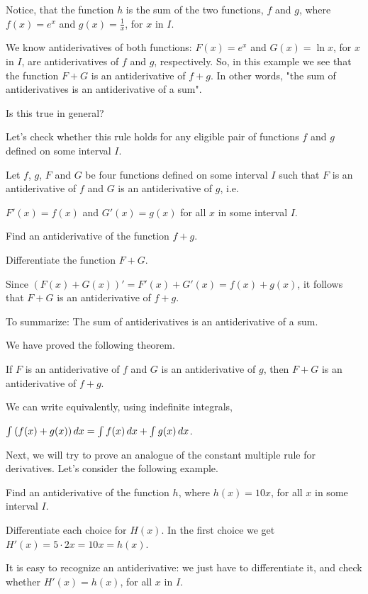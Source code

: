 \documentclass{ximera}
\begin{document}
Notice, that the function $h$ is the sum of the two functions, $f$ and $g$, where $f(x)=e^x$ and $g(x)=\frac{1}{x}$, for $x$ in $I$.

We know antiderivatives of both functions:  $F(x)=e^x$ and $G(x)=\ln{x}$,  for $x$ in $I$, are antiderivatives of $f$ and $g$, respectively.
So, in this example we see that the function  $F+G$ is an antiderivative of $f+g$.
In other words, "the sum of antiderivatives is an antiderivative of a sum".

Is this true in general?

Let's check whether this rule holds for any eligible pair of functions $f$ and $g$ defined on some interval $I$.
 \begin{question}
Let $f$, $g$, $F$ and $G$ be four functions defined on some interval $I$ such that $F$ is an antiderivative of $f$ and $G$ is an antiderivative of $g$, i.e.

$F'(x)=f(x)$ and $G'(x)=g(x)$ for all $x$ in some interval $I$.

  Find an antiderivative of the function $f+g$.
    \begin{hint}
    Differentiate the function $F+G$.
     \end{hint}
     Since
     $\left(F(x)+G(x)\right)'=F'(x)+G'(x)=f(x)+g(x)$,
     it follows that  $F+G$ is an antiderivative of $f+g$.

 To summarize: The sum of antiderivatives is an antiderivative of a sum.
\end{question}
We have proved the following theorem.

\begin{theorem}\label{theorem:SRA}
If $F$ is an antiderivative of $f$ and $G$ is an antiderivative of
$g$, then $F+G$ is an antiderivative of $f+g$.

We can write equivalently, using indefinite integrals,

$\int \left(f(x)+g(x)\right) \mathop{}\!d x= \int f(x)\mathop{}\!d x +\int g(x) \mathop{}\!d x$.
\end{theorem}

Next, we will try to prove an analogue of the constant multiple rule for derivatives.
Let's consider the following example.
\begin{example}
  Find  an antiderivative of the function $h$, where
   $h(x)=10x$,  for all $x$ in some interval $I$.
  \begin{multipleChoice}
  \end{multipleChoice}
  \begin{feedback}
    Differentiate each choice for $H(x)$.  In the first choice we get
    $H'(x)=5\cdot 2x = 10x =h(x)$.
  \end{feedback}
\end{example}
It is easy to recognize an antiderivative: we just have to differentiate it, and check whether $H'(x)=h(x)$, for all $x$ in $I$.
\end{document}
